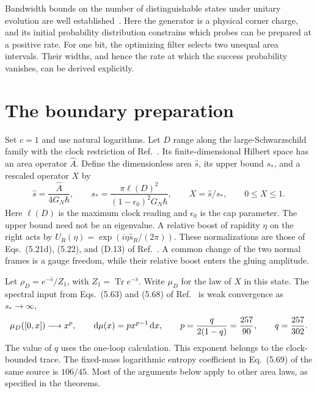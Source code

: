 \documentclass[11pt,letterpaper]{article}
\newcommand{\Tr}{\operatorname{Tr}}
\newcommand{\dd}{\mathop{}\!{\rm d}}
\newcommand{\sg}{s_*}
\begin{document}
Bandwidth bounds on the number of distinguishable states under unitary evolution are well established~\cite{margolus}. Here the generator is a physical corner charge, and its initial probability distribution constrains which probes can be prepared at a positive rate. For one bit, the optimizing filter selects two unequal area intervals. Their widths, and hence the rate at which the success probability vanishes, can be derived explicitly.

\section{The boundary preparation}
Set $c=1$ and use natural logarithms. Let $D$ range along the large-Schwarzschild family with the clock restriction of Ref.~\cite{chandra}. Its finite-dimensional Hilbert space has an area operator $\hat A$. Define the dimensionless area $\hat s$, its upper bound $\sg$, and a rescaled operator $X$ by
\begin{equation}\label{eq:area}
 \hat s=\frac{\hat A}{4G_N\hbar},\qquad
 \sg=\frac{\pi\ell(D)^2}{(1-\epsilon_0)^2G_N\hbar},\qquad
 X=\hat s/\sg,\qquad 0\leq X\leq 1 .
\end{equation}
Here $\ell(D)$ is the maximum clock reading and $\epsilon_0$ is the cap parameter. The upper bound need not be an eigenvalue. A relative boost of rapidity $\eta$ on the right acts by $U_R(\eta)=\exp(i\eta\hat s_R/(2\pi))$. These normalizations are those of Eqs.~(5.21d), (5.22), and (D.13) of Ref.~\cite{chandra}. A common change of the two normal frames is a gauge freedom, while their relative boost enters the gluing amplitude.

Let $\rho_D=e^{-\hat s}/Z_1$, with $Z_1=\Tr e^{-\hat s}$. Write $\mu_D$ for the law of $X$ in this state. The spectral input from Eqs.~(5.63) and (5.68) of Ref.~\cite{chandra} is weak convergence as $\sg\to\infty$,
\begin{equation}\label{eq:law}
 \mu_D([0,x])\longrightarrow x^p,\qquad
 \dd\mu(x)=p x^{p-1}\dd x,\qquad
 p=\frac{q}{2(1-q)}=\frac{257}{90},\qquad q=\frac{257}{302}.
\end{equation}
The value of $q$ uses the one-loop calculation. This exponent belongs to the clock-bounded trace. The fixed-mass logarithmic entropy coefficient in Eq.~(5.69) of the same source is $106/45$. Most of the arguments below apply to other area laws, as specified in the theorems.
\end{document}
